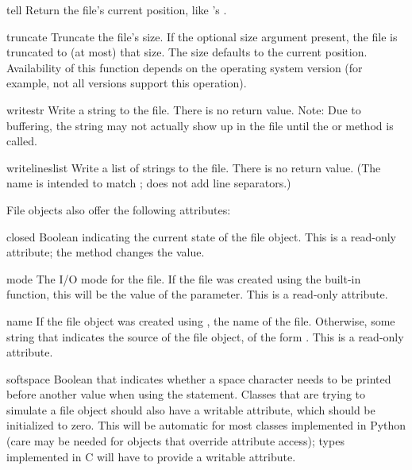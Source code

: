 \begin{methoddesc}[file]{tell}{}
  Return the file's current position, like 's
  .
\end{methoddesc}

\begin{methoddesc}[file]{truncate}{}
Truncate the file's size.  If the optional size argument present, the
file is truncated to (at most) that size.  The size defaults to the
current position.  Availability of this function depends on the
operating system version (for example, not all \UNIX{} versions support this
operation).
\end{methoddesc}

\begin{methoddesc}[file]{write}{str}
Write a string to the file.  There is no return value.  Note: Due to
buffering, the string may not actually show up in the file until
the  or  method is called.
\end{methoddesc}

\begin{methoddesc}[file]{writelines}{list}
Write a list of strings to the file.  There is no return value.
(The name is intended to match ;
 does not add line separators.)
\end{methoddesc}


File objects also offer the following attributes:

\begin{memberdesc}[file]{closed}
Boolean indicating the current state of the file object.  This is a
read-only attribute; the  method changes the value.
\end{memberdesc}

\begin{memberdesc}[file]{mode}
The I/O mode for the file.  If the file was created using the
 built-in function, this will be the value of the
 parameter.  This is a read-only attribute.
\end{memberdesc}

\begin{memberdesc}[file]{name}
If the file object was created using , the name of
the file.  Otherwise, some string that indicates the source of the
file object, of the form \samp{<\mbox{\ldots}>}.  This is a read-only
attribute.
\end{memberdesc}

\begin{memberdesc}[file]{softspace}
Boolean that indicates whether a space character needs to be printed
before another value when using the  statement.
Classes that are trying to simulate a file object should also have a
writable  attribute, which should be initialized to
zero.  This will be automatic for most classes implemented in Python
(care may be needed for objects that override attribute access); types
implemented in C will have to provide a writable
 attribute.
\end{memberdesc}

